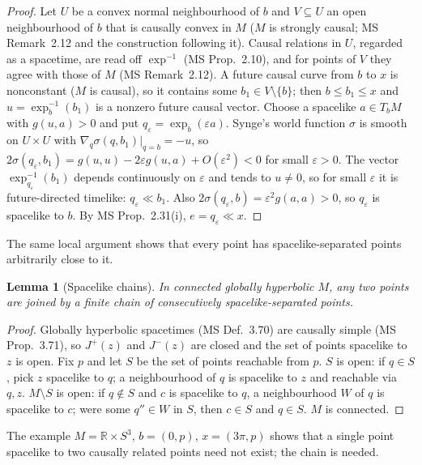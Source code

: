 \documentclass[11pt]{article}
\newtheorem{lemma}[theorem]{Lemma}
\theoremstyle{definition}
\newcommand{\Jp}{J^{+}}
\newcommand{\Jm}{J^{-}}
\begin{document}
\begin{proof}
Let $U$ be a convex normal neighbourhood of $b$ and $V\subseteq U$ an open
neighbourhood of $b$ that is causally convex in $M$ ($M$ is strongly causal;
MS Remark~2.12 and the construction following it). Causal relations in $U$,
regarded as a spacetime, are read off $\exp^{-1}$ (MS Prop.~2.10), and for
points of $V$ they agree with those of $M$ (MS Remark~2.12). A future causal
curve from $b$ to $x$ is nonconstant ($M$ is causal), so it contains some
$b_1\in V\setminus\{b\}$; then $b\le b_1\le x$ and $u=\exp_b^{-1}(b_1)$ is
a nonzero future causal vector. Choose a spacelike $a\in T_bM$ with
$g(u,a)>0$ and put $q_\varepsilon=\exp_b(\varepsilon a)$. Synge's world
function $\sigma$ is smooth on $U\times U$ with $\nabla_q\sigma(q,b_1)|_{q=b}=-u$,
so $2\sigma(q_\varepsilon,b_1)=g(u,u)-2\varepsilon g(u,a)+O(\varepsilon^2)<0$ for
small $\varepsilon>0$. The vector $\exp^{-1}_{q_\varepsilon}(b_1)$ depends
continuously on $\varepsilon$ and tends to $u\neq0$, so for small $\varepsilon$
it is future-directed timelike: $q_\varepsilon\ll b_1$. Also
$2\sigma(q_\varepsilon,b)=\varepsilon^2g(a,a)>0$, so $q_\varepsilon$ is spacelike
to $b$. By MS Prop.~2.31(i), $e=q_\varepsilon\ll x$.
\end{proof}

The same local argument shows that every point has spacelike-separated
points arbitrarily close to it.

\begin{lemma}[Spacelike chains]\label{lem:E}
In connected globally hyperbolic $M$, any two points are joined by a finite
chain of consecutively spacelike-separated points.
\end{lemma}

\begin{proof}
Globally hyperbolic spacetimes (MS Def.~3.70) are causally simple (MS
Prop.~3.71), so $\Jp(z)$ and $\Jm(z)$ are closed and the set of points
spacelike to $z$ is open. Fix $p$ and let $S$ be the set of points reachable
from $p$. $S$ is open: if $q\in S$, pick $z$ spacelike to $q$; a
neighbourhood of $q$ is spacelike to $z$ and reachable via $q,z$.
$M\setminus S$ is open: if $q\notin S$ and $c$ is spacelike to $q$, a
neighbourhood $W$ of $q$ is spacelike to $c$; were some $q''\in W$ in $S$, then
$c\in S$ and $q\in S$. $M$ is connected.
\end{proof}

The example $M=\mathbb R\times S^3$, $b=(0,p)$, $x=(3\pi,p)$ shows that a single
point spacelike to two causally related points need not exist; the chain is
needed.
\end{document}
